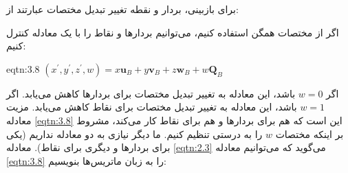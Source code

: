 {
    \Large
    \begin{spacing}{1.5}
        برای بازبینی، بردار و نقطه تغییر تبدیل مختصات عبارتند از:
        \begin{flushleft}
        \end{flushleft}
        اگر از مختصات همگن استفاده کنیم، می‌توانیم بردارها و نقاط را با یک معادله کنترل کنیم:
        \begin{eqtn}{eqtn:3.8}
            \centering
            $(x^\prime,y^\prime,z^\prime,w)=x\textbf{u}_{B}+y\textbf{v}_{B}+z\textbf{w}_{B}+w\textbf{Q}_{B}$
        \end{eqtn}
    \end{spacing}
    \begin{spacing}{1.6}
        اگر $w=0$ باشد، این معادله به تغییر تبدیل مختصات برای بردارها کاهش می‌یابد.
        اگر $w=1$ باشد، این معادله به تغییر تبدیل مختصات برای نقاط کاهش می‌یابد.
        مزیت معادله \ref{eqtn:3.8} این است که هم برای بردارها و هم برای نقاط کار می‌کند، مشروط بر اینکه مختصات $w$ را به درستی تنظیم کنیم.
        ما دیگر نیازی به دو معادله نداریم (یکی برای بردارها و دیگری برای نقاط). معادله \ref{eqtn:2.3} می‌گوید که می‌توانیم معادله \ref{eqtn:3.8} را به زبان ماتریس‌ها بنویسیم:


\end{spacing}}

